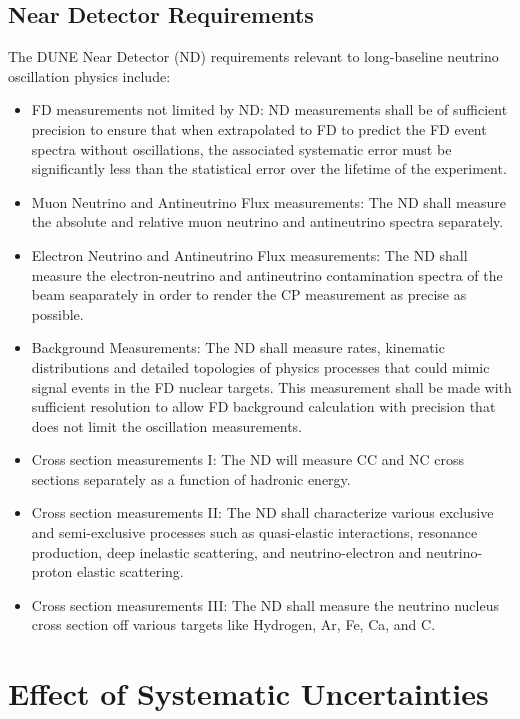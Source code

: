 \subsection{Near Detector Requirements}
\label{sec:physics-lbnosc-nd-req}

The DUNE Near Detector (ND) requirements relevant to long-baseline neutrino oscillation physics include:
\begin{itemize}
 \item FD measurements not limited by ND: ND measurements shall be of sufficient precision to ensure that when extrapolated to FD to predict the FD event spectra without oscillations, the associated systematic error must be significantly less than the statistical error over the lifetime of the experiment. 
 \item Muon Neutrino and Antineutrino Flux measurements: The ND shall measure the absolute and relative muon neutrino and antineutrino spectra separately.
 \item Electron Neutrino and Antineutrino Flux measurements: The ND shall measure the electron-neutrino and antineutrino contamination spectra of the beam seaparately in order to render the CP measurement as precise as possible.
 \item Background Measurements: The ND shall measure rates, kinematic distributions and detailed topologies of physics processes that could mimic signal events in the FD nuclear targets. This measurement shall be made with sufficient resolution to allow FD background calculation with precision that does not limit the oscillation measurements.
 \item Cross section measurements I: The ND will measure CC and NC cross sections separately as a function of hadronic energy.
 \item Cross section measurements II: The ND shall characterize various exclusive and semi-exclusive processes such as quasi-elastic interactions, resonance production, deep inelastic scattering, and neutrino-electron and neutrino-proton elastic scattering.
 \item Cross section measurements III: The ND shall measure the neutrino nucleus cross section off various targets like Hydrogen, Ar, Fe, Ca, and C.
\end{itemize}

\section{Effect of Systematic Uncertainties}
\label{sec:physics-lbnosc-beamnd-req}


